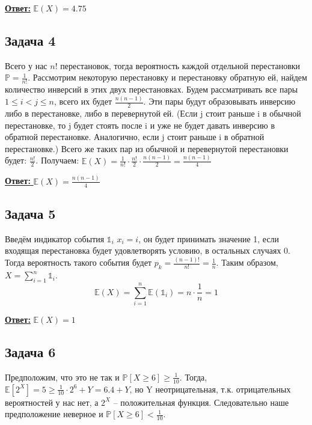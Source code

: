 \documentclass[a4paper,14pt]{article} %
\begin{document}
\underline{\textbf{Ответ:}} $\mathds{E}(X) = 4.75$
\newpage
\subsection{Задача 4}
Всего у нас $n!$ перестановок, тогда вероятность каждой отдельной перестановки $\mathds{P} = \frac{1}{n!}$.
Рассмотрим некоторую перестановку и перестановку обратную ей, найдем количество инверсий в этих двух перестановках.
Будем рассматривать все пары $1 \leq i < j \leq n$, всего их будет $\frac{n(n-1)}{2}$. Эти пары будут образовывать инверсию либо в перестановке, либо в перевернутой ей.
\newline
(Если j стоит раньше i в обычной перестановке, то j будет стоять после i и уже не будет давать инверсию в обратной перестановке. Аналогично, если j стоит раньше i в обратной перестановке.)
Всего же таких пар из обычной и перевернутой перестановки будет: $\frac{n!}{2}$.
Получаем: $\mathds{E}(X) = \frac{1}{n!} \cdot \frac{n!}{2} \cdot \frac{n(n-1)}{2} = \frac{n(n-1)}{4}$

\underline{\textbf{Ответ: }} $\mathds{E}(X) = \frac{n(n-1)}{4}$


\subsection{Задача 5}
Введём индикатор события $\mathds{1}_i$ $x_i = i$, он будет принимать значение 1, если входящая перестановка будет удовлетворять условию, в остальных случаях 0.
Тогда вероятность такого события будет $p_k = \frac{(n-1)!}{n!} = \frac{1}{n}$. 
\newline
Таким образом, $X = \sum\limits_{i = 1}^n \mathds{1}_i$.
\begin{equation*}
	\mathds{E}(X) = \sum\limits_{i = 1}^n \mathds{E}(\mathds{1}_i) = n \cdot \frac{1}{n} = 1
\end{equation*}

\underline{\textbf{Ответ:}} $\mathds{E}(X) = 1$

\subsection{Задача 6}
Предположим, что это не так и $\mathds{P}[X \geq 6] \geq \frac{1}{10}$.
\newline
Тогда, $\mathds{E}[2^X] = 5 \geq \frac{1}{10} \cdot 2^6 + Y = 6.4 + Y$, но Y неотрицательная, т.к. отрицательных вероятностей у нас нет, а $2^X$ -- положительная функция.
\newline 
Следовательно наше предположение неверное и $\mathds{P}[X \geq 6] < \frac{1}{10}.$
\end{document}
